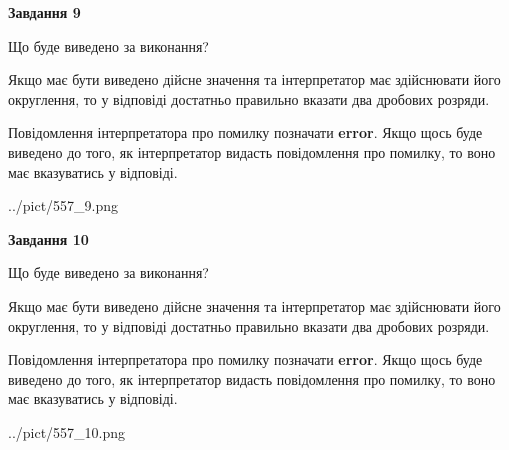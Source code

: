 \documentclass[12pt, ukrainian]{article}
\begin{document}
{\begin {Large}
{\begin {center}\textbf{Завдання 9}\end {center}}\par
Що буде виведено за виконання? \par

Якщо має бути виведено дійсне значення та інтерпретатор має здійснювати його округлення, 
то у відповіді достатньо правильно вказати два дробових розряди.

Повідомлення інтерпретатора про помилку позначати \textbf{error}.
Якщо щось буде виведено до того, як інтерпретатор видасть повідомлення про помилку, 
то воно має вказуватись у відповіді. \par

\begin{center}
	{../pict/557_9.png}
\end{center}
\newpage

{\begin {center}\textbf{Завдання 10}\end {center}}\par
Що буде виведено за виконання? \par

Якщо має бути виведено дійсне значення та інтерпретатор має здійснювати його округлення, 
то у відповіді достатньо правильно вказати два дробових розряди.

Повідомлення інтерпретатора про помилку позначати \textbf{error}.
Якщо щось буде виведено до того, як інтерпретатор видасть повідомлення про помилку, 
то воно має вказуватись у відповіді. \par

\begin{center}
	{../pict/557_10.png}
\end{center}
\newpage

\end {Large}}
\end{document}
